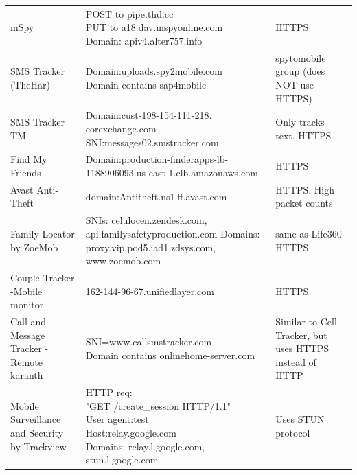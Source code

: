 \documentclass[acmtog]{acmart}
\begin{document}
\begin{table}
\begin{tabular}{p{5cm}p{5cm}p{5cm}}
	mSpy & \makecell{POST to pipe.thd.cc\\
	PUT to a18.dav.mspyonline.com\\
	Domain: apiv4.alter757.info} & HTTPS \\
	
	SMS Tracker (TheHar) & \makecell{Domain:uploads.spy2mobile.com\\ Domain contains sap4mobile} & spytomobile group (does NOT use HTTPS) \\
	
	SMS Tracker TM & \makecell{Domain:cust-198-154-111-218.\\corexchange.com \\ SNI:messages02.smstracker.com} & Only tracks text. HTTPS \\
	
	Find My Friends & Domain:production-finderapps-lb-1188906093.us-east-1.elb.amazonaws.com & HTTPS\\
	
	Avast Anti-Theft & domain:Antitheft.ns1.ff.avast.com& HTTPS. High packet counts\\
	
	Family Locator by ZoeMob & SNIs: celulocen.zendesk.com, api.familysafetyproduction.com
	Domains: proxy.vip.pod5.iad1.zdsys.com, www.zoemob.com & same as Life360
	HTTPS \\
	
	Couple Tracker -Mobile monitor & 162-144-96-67.unifiedlayer.com & HTTPS \\
	
	Call and Message Tracker -Remote karanth & \makecell{SNI=www.callsmstracker.com
	\\Domain contains onlinehome-server.com} & Similar to Cell Tracker, but uses HTTPS instead of HTTP \\
	
	Mobile Surveillance and Security
	by Trackview & \makecell{HTTP req:\\ "GET /create\_session HTTP/1.1"\\ User agent:test \\Host:relay.google.com\\
	Domains: relay.l.google.com,\\ stun.l.google.com} & Uses STUN protocol \\
	
\end{tabular}
\end{table}
\end{document}
